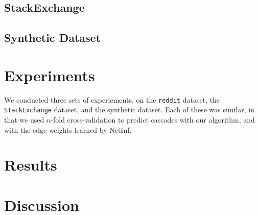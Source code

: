 \documentclass{article} %
\begin{document}
\subsection{StackExchange}

\subsection{Synthetic Dataset}




\section{Experiments}
\label{experiments}

We conducted three sets of experiements, on the \texttt{reddit} dataset, the \texttt{StackExchange} dataset, and the synthetic dataset. Each of these was similar, in that we used $n$-fold cross-validation to predict cascades with our algorithm, and with the edge weights learned by NetInf.




\section{Results}
\label{results}




\section{Discussion}
\label{discussion}


{}
\label{refs}

\end{document}
